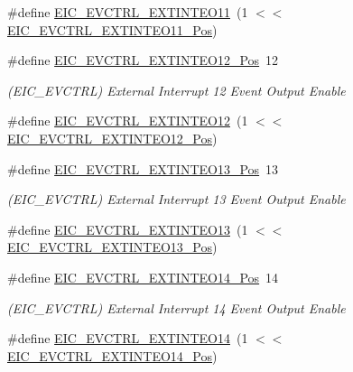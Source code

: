 \begin{DoxyCompactItemize}
\#define \mbox{\hyperlink{group___s_a_m_d21___e_i_c_gae932c7f3d389d9ed0500567ddbc24e45}{E\+I\+C\+\_\+\+E\+V\+C\+T\+R\+L\+\_\+\+E\+X\+T\+I\+N\+T\+E\+O11}}~(1 $<$$<$ \mbox{\hyperlink{group___s_a_m_d21___e_i_c_ga4d130ad6d8d6fe20d430951fb7f27035}{E\+I\+C\+\_\+\+E\+V\+C\+T\+R\+L\+\_\+\+E\+X\+T\+I\+N\+T\+E\+O11\+\_\+\+Pos}})
\item 
\#define \mbox{\hyperlink{group___s_a_m_d21___e_i_c_gafee7db70d88521dc34b2d750e696ef00}{E\+I\+C\+\_\+\+E\+V\+C\+T\+R\+L\+\_\+\+E\+X\+T\+I\+N\+T\+E\+O12\+\_\+\+Pos}}~12
\begin{DoxyCompactList}\small\item\em (E\+I\+C\+\_\+\+E\+V\+C\+T\+RL) External Interrupt 12 Event Output Enable \end{DoxyCompactList}\item 
\#define \mbox{\hyperlink{group___s_a_m_d21___e_i_c_gaa3f0bbb2ac8ce4a1830310b41d93fd3e}{E\+I\+C\+\_\+\+E\+V\+C\+T\+R\+L\+\_\+\+E\+X\+T\+I\+N\+T\+E\+O12}}~(1 $<$$<$ \mbox{\hyperlink{group___s_a_m_d21___e_i_c_gafee7db70d88521dc34b2d750e696ef00}{E\+I\+C\+\_\+\+E\+V\+C\+T\+R\+L\+\_\+\+E\+X\+T\+I\+N\+T\+E\+O12\+\_\+\+Pos}})
\item 
\#define \mbox{\hyperlink{group___s_a_m_d21___e_i_c_gab633e9d1b7a20384b2ced862685ce5a7}{E\+I\+C\+\_\+\+E\+V\+C\+T\+R\+L\+\_\+\+E\+X\+T\+I\+N\+T\+E\+O13\+\_\+\+Pos}}~13
\begin{DoxyCompactList}\small\item\em (E\+I\+C\+\_\+\+E\+V\+C\+T\+RL) External Interrupt 13 Event Output Enable \end{DoxyCompactList}\item 
\#define \mbox{\hyperlink{group___s_a_m_d21___e_i_c_ga874a28fbea2baad59dffdd26ae44c56e}{E\+I\+C\+\_\+\+E\+V\+C\+T\+R\+L\+\_\+\+E\+X\+T\+I\+N\+T\+E\+O13}}~(1 $<$$<$ \mbox{\hyperlink{group___s_a_m_d21___e_i_c_gab633e9d1b7a20384b2ced862685ce5a7}{E\+I\+C\+\_\+\+E\+V\+C\+T\+R\+L\+\_\+\+E\+X\+T\+I\+N\+T\+E\+O13\+\_\+\+Pos}})
\item 
\#define \mbox{\hyperlink{group___s_a_m_d21___e_i_c_ga0c4ce264a32c47fe2893aa90e66f228d}{E\+I\+C\+\_\+\+E\+V\+C\+T\+R\+L\+\_\+\+E\+X\+T\+I\+N\+T\+E\+O14\+\_\+\+Pos}}~14
\begin{DoxyCompactList}\small\item\em (E\+I\+C\+\_\+\+E\+V\+C\+T\+RL) External Interrupt 14 Event Output Enable \end{DoxyCompactList}\item 
\#define \mbox{\hyperlink{group___s_a_m_d21___e_i_c_ga6f458e4b0d996843d21a2525cff4760f}{E\+I\+C\+\_\+\+E\+V\+C\+T\+R\+L\+\_\+\+E\+X\+T\+I\+N\+T\+E\+O14}}~(1 $<$$<$ \mbox{\hyperlink{group___s_a_m_d21___e_i_c_ga0c4ce264a32c47fe2893aa90e66f228d}{E\+I\+C\+\_\+\+E\+V\+C\+T\+R\+L\+\_\+\+E\+X\+T\+I\+N\+T\+E\+O14\+\_\+\+Pos}})

\end{DoxyCompactItemize}
